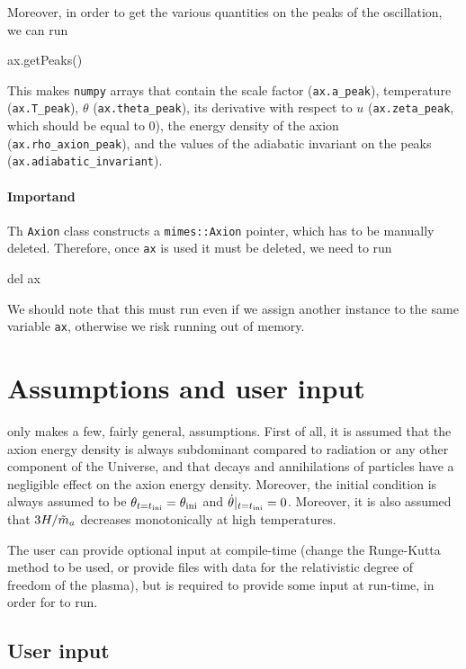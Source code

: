 \documentclass[11pt,a4paper]{article}
\begin{document}
Moreover, in order to get the various quantities on the peaks of the oscillation, we can run
%
\begin{py}
	ax.getPeaks()
\end{py}
%
This makes {\tt numpy} arrays that contain the scale factor ({\tt ax.a\_peak}), temperature ({\tt ax.T\_peak}), $\theta$ ({\tt ax.theta\_peak}), its derivative with respect to $u$ ({\tt ax.zeta\_peak}, which should be equal to $0$), the energy density of the axion ({\tt ax.rho\_axion\_peak}), and the values of the adiabatic invariant on the peaks ({\tt ax.adiabatic\_invariant}).

\paragraph{Importand} Th {\tt Axion} class constructs a {\tt mimes::Axion} pointer, which has to be manually deleted. Therefore, once {\tt ax} is used it must be deleted, \ie we need to run 
%
\begin{py}
	del ax
\end{py}
%
We should note that this must run even if we assign another instance to the same variable {\tt ax}, otherwise we risk running out of memory.

\section{Assumptions and user input}\label{sec:assumptions}
\setcounter{equation}{0}
%
\mimes only makes a few, fairly general, assumptions. First of all, it is assumed that the axion energy density is always subdominant compared to radiation or any other component of the Universe, and that decays and annihilations of particles have a negligible effect on the axion energy density. Moreover, the initial condition is always assumed to be $\theta_{t=t_{\rm ini}{}} = \theta_{\rm ini}{}$ and $\dot \theta|_{t=t_{\rm ini}{}}=0$. Moreover, it is also assumed that $3H/\tilde m_{a}{}$ decreases monotonically at high temperatures. 

The user can provide optional input at compile-time (\eg change the Runge-Kutta method to be used, or provide files with data for the relativistic degree of freedom of the plasma), but is required to provide some input at run-time, in order for \mimes to run. 

\subsection{User input}\label{sec:input}
%
\end{document}
